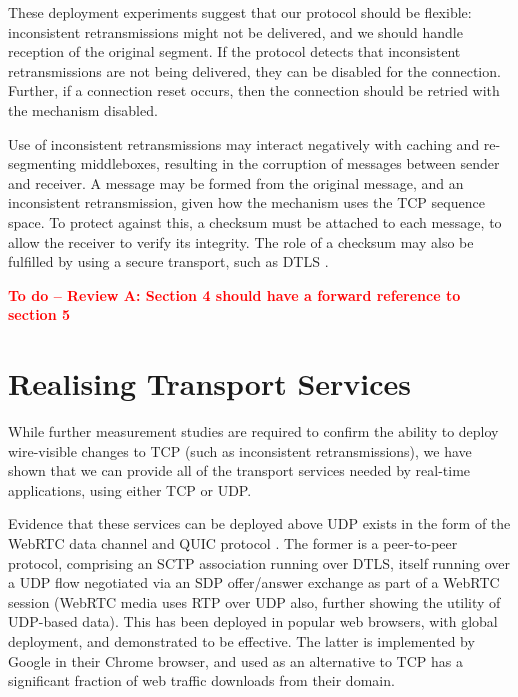 \documentclass[10pt]{sig-alternate-05-2015}
\newcommand{\todo}[1]{\textbf{\textcolor{red}{To do -- #1}}}
\begin{document}
These deployment experiments suggest that our protocol should be
flexible: inconsistent retransmissions might not be delivered, and we should
handle reception of the original segment. If the protocol detects that
inconsistent retransmissions are not being delivered, they
can be disabled for the connection. Further, if a connection reset occurs,
then the connection should be retried with the mechanism disabled.

Use of inconsistent retransmissions may interact negatively with
caching and re-segmenting middleboxes, resulting in the corruption of
messages between sender and receiver. A message may be formed from the
original message, and an inconsistent retransmission, given how the
mechanism uses the TCP sequence space. To protect against this, a checksum
must be attached to each message, to allow the receiver to verify its
integrity. The role of a checksum may also be fulfilled by using a secure
transport, such as DTLS \cite{rfc:6347}.

\todo{Review A: Section 4 should have a forward reference to section 5}
\section{Realising Transport Services}
\label{sec:realising}

While further measurement studies are required to confirm the ability to
deploy wire-visible changes to TCP (such as inconsistent retransmissions),
we have shown that we can provide all of the transport services needed by
real-time applications, using either TCP or UDP.

Evidence that these services can be deployed above UDP exists in the form
of the WebRTC data channel \cite{draft-ietf-rtcweb-data-channel-13} and
QUIC protocol \cite{draft-tsvwg-quic-protocol-02}.
The former is a peer-to-peer protocol, comprising an SCTP association
running over DTLS, itself running over a UDP flow negotiated via an SDP
\cite{RFC4566} offer/answer exchange \cite{RFC3264} as part of a WebRTC
session \cite{jennings:2013:rtcweb} (WebRTC media uses RTP
over UDP also, further showing the utility of UDP-based data).
This has been deployed in popular web browsers, with global deployment, and
demonstrated to be effective.  The latter is implemented by Google in their
Chrome browser, and used as an alternative to TCP has a significant
fraction of web traffic downloads from their domain.
\end{document}
